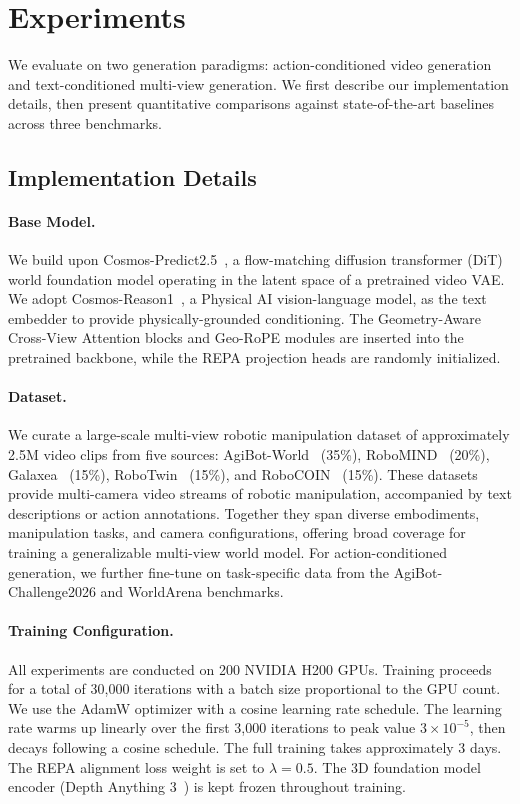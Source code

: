 \section{Experiments}
\label{sec:experiments}

We evaluate \methodname{} on two generation paradigms: action-conditioned video generation and text-conditioned multi-view generation. We first describe our implementation details, then present quantitative comparisons against state-of-the-art baselines across three benchmarks.

\subsection{Implementation Details}
\label{sec:impl}

\paragraph{Base Model.}
We build \methodname{} upon Cosmos-Predict2.5~\cite{nvidia2025cosmospredict25}, a flow-matching diffusion transformer (DiT) world foundation model operating in the latent space of a pretrained video VAE. We adopt Cosmos-Reason1~\cite{nvidia2025cosmosreason1}, a Physical AI vision-language model, as the text embedder to provide physically-grounded conditioning. The Geometry-Aware Cross-View Attention blocks and Geo-RoPE modules are inserted into the pretrained backbone, while the REPA projection heads are randomly initialized.

\paragraph{Dataset.}
We curate a large-scale multi-view robotic manipulation dataset of approximately 2.5M video clips from five sources: AgiBot-World~\cite{bu2025agibotworld} (35\%), RoboMIND~\cite{wu2024robomind} (20\%), Galaxea~\cite{jiang2025galaxea} (15\%), RoboTwin~\cite{mu2025robotwin} (15\%), and RoboCOIN~\cite{wu2025robocoin} (15\%). These datasets provide multi-camera video streams of robotic manipulation, accompanied by text descriptions or action annotations. Together they span diverse embodiments, manipulation tasks, and camera configurations, offering broad coverage for training a generalizable multi-view world model. For action-conditioned generation, we further fine-tune on task-specific data from the AgiBot-Challenge2026 and WorldArena benchmarks.

\paragraph{Training Configuration.}
All experiments are conducted on 200 NVIDIA H200 GPUs. Training proceeds for a total of 30,000 iterations with a batch size proportional to the GPU count. We use the AdamW optimizer with a cosine learning rate schedule. The learning rate warms up linearly over the first 3,000 iterations to peak value $3 \times 10^{-5}$, then decays following a cosine schedule. The full training takes approximately 3 days. The REPA alignment loss weight is set to $\lambda = 0.5$. The 3D foundation model encoder (Depth Anything 3~\cite{lin2025depthanything3}) is kept frozen throughout training.

